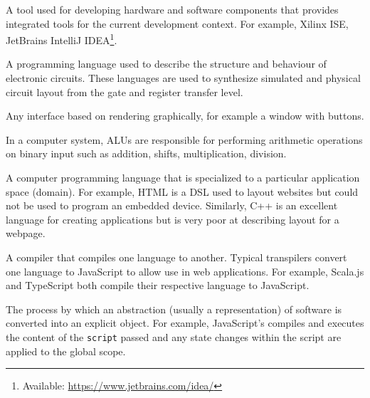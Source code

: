 \begin{definition}
    A tool used for developing hardware and software components that provides integrated tools for the current development context. For example, Xilinx ISE\cite{xilinxISE}, JetBrains IntelliJ IDEA\footnote{Available: \url{https://www.jetbrains.com/idea/}}.
\end{definition}

\begin{definition}
    A programming language used to describe the structure and behaviour of electronic circuits. These languages are used to synthesize simulated and physical circuit layout from the gate and register transfer level\cite{Chu2006}.
\end{definition}

\begin{definition}
    Any interface based on rendering graphically, for example a window with buttons. 
\end{definition}

\begin{definition}
    In a computer system, ALUs are responsible for performing arithmetic operations on binary input such as addition, shifts, multiplication, division.
\end{definition}

\begin{definition}
    A computer programming language that is specialized to a particular application space (domain). For example, HTML is a DSL used to layout websites but could not be used to program an embedded device. Similarly, C++ is an excellent language for creating applications but is very poor at describing layout for a webpage.
\end{definition}

\begin{definition}[Transpiler]
    A compiler that compiles one language to another. Typical transpilers convert one language to JavaScript to allow use in web applications. For example, Scala.js and TypeScript both compile their respective language to JavaScript.
\end{definition}

\begin{definition}[Reification]
    The process by which an abstraction (usually a  representation) of software is converted into an explicit object. For example, JavaScript's  compiles and executes the content of the \verb|script| passed and any state changes within the script are applied to the global scope.
\end{definition}

